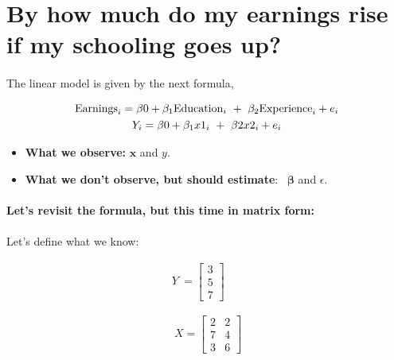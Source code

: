 \documentclass[10pt]{article}
\begin{document}
\section{By how much do my earnings rise if my schooling goes up?}

\paragraph{}The linear model is given by the next formula,



\begin{gather*}
 \text{Earnings}_{i} = \beta 0+\beta_{1}\text{Education}_{i} \ +\ \beta_{2}\text{Experience}_{i} + e_{i}\\\notag
Y_{i} = \beta 0+\beta_{1}x1_{i} \ +\ \beta 2x2_{i} +e_{i} \notag
\end{gather*}





\begin{itemize}
\item \textbf{What we observe:} $\displaystyle {\boldsymbol x}$ and $\displaystyle y$. 
\item \textbf{What we don't observe, but should estimate}: \ $\displaystyle \boldsymbol{\beta} $ and $\displaystyle \epsilon $.
\end{itemize}



\paragraph{}{\Large \textbf{Let's revisit the formula, but this time in matrix form:}}



\paragraph{}Let's define what we know:


\begin{gather*}
Y\ =\begin{bmatrix}
3\\
5\\
7
\end{bmatrix}\\
\\
\\
\ X=\begin{bmatrix}
2 & 2\\
7 & 4\\
3 & 6
\end{bmatrix}
\end{gather*}
\begin{equation*}
\end{equation*}
\end{document}
